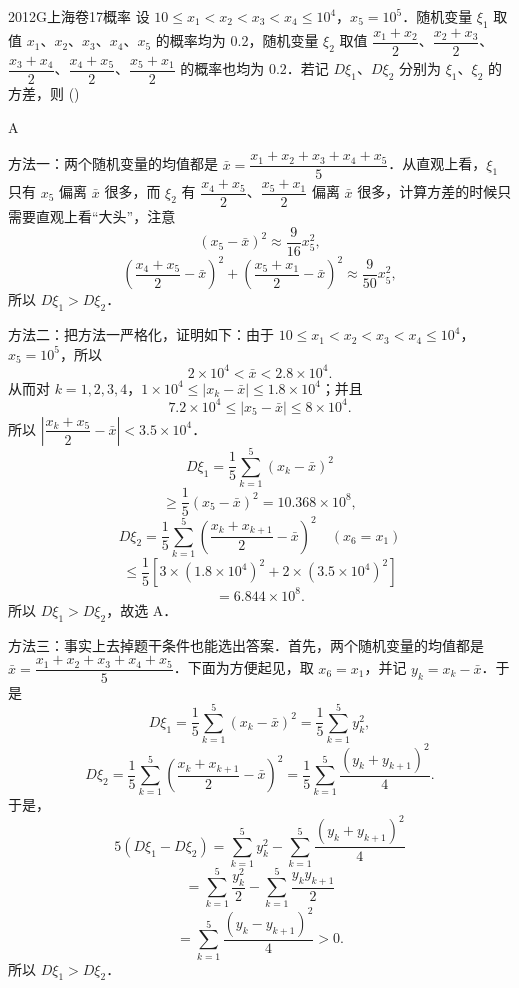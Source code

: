 
\begin{problem}{2012}{G}{上海卷}{17}{概率}
设 $10\leqslant x_1<x_2<x_3<x_4\leqslant 10^4$，$x_5=10^5$．随机变量 $\xi_1$ 取值 $x_1$、$x_2$、$x_3$、$x_4$、$x_5$ 的概率均为 $0.2$，随机变量 $\xi_2$ 取值 $\dfrac{x_1+x_2}{2}$、$\dfrac{x_2+x_3}{2}$、$\dfrac{x_3+x_4}{2}$、$\dfrac{x_4+x_5}{2}$、$\dfrac{x_5+x_1}{2}$ 的概率也均为 $0.2$．若记 $D\xi_1$、$D\xi_2$ 分别为 $\xi_1$、$\xi_2$ 的方差，则 (\hspace{1cm})
\begin{choices}
\end{choices}
\end{problem}

\begin{answer}
A
\end{answer}

\begin{solutions}
方法一：两个随机变量的均值都是 $\bar{x}=\dfrac{x_1+x_2+x_3+x_4+x_5}{5}$．从直观上看，$\xi_1$ 只有 $x_5$ 偏离 $\bar{x}$ 很多，而 $\xi_2$ 有 $\dfrac{x_4+x_5}{2}$、$\dfrac{x_5+x_1}{2}$ 偏离 $\bar{x}$ 很多，计算方差的时候只需要直观上看“大头”，注意
$$
(x_5-\bar{x})^2\approx\dfrac{9}{16}x_5^2,
$$
$$
\left(\dfrac{x_4+x_5}{2}-\bar{x}\right)^2+\left(\dfrac{x_5+x_1}{2}-\bar{x}\right)^2\approx\dfrac{9}{50}x_5^2,
$$
所以 $D\xi_1>D\xi_2$．

方法二：把方法一严格化，证明如下：由于 $10\leqslant x_1<x_2<x_3<x_4\leqslant 10^4$，$x_5=10^5$，所以
$$
2\times 10^4<\bar{x}<2.8\times 10^4.
$$
从而对 $k=1,2,3,4$，$1\times 10^4\leqslant |x_k-\bar{x}|\leqslant 1.8\times 10^4$；并且
$$
7.2\times 10^4\leqslant |x_5-\bar{x}|\leqslant 8\times 10^4.
$$
所以 $\left|\dfrac{x_k+x_5}{2}-\bar{x}\right|<3.5\times 10^4$．
$$
D\xi_1=\dfrac{1}{5}\sum_{k=1}^{5}(x_k-\bar{x})^2
$$
$$
\geqslant\dfrac{1}{5}(x_5-\bar{x})^2=10.368\times 10^8,
$$
$$
D\xi_2=\dfrac{1}{5}\sum_{k=1}^{5}\left(\dfrac{x_k+x_{k+1}}{2}-\bar{x}\right)^2\quad (x_6=x_1)
$$
$$
\leqslant\dfrac{1}{5}\left[3\times(1.8\times 10^4)^2+2\times(3.5\times 10^4)^2\right]
$$
$$
=6.844\times 10^8.
$$
所以 $D\xi_1>D\xi_2$，故选 A．

方法三：事实上去掉题干条件也能选出答案．首先，两个随机变量的均值都是 $\bar{x}=\dfrac{x_1+x_2+x_3+x_4+x_5}{5}$．下面为方便起见，取 $x_6=x_1$，并记 $y_k=x_k-\bar{x}$．于是
$$
D\xi_1=\dfrac{1}{5}\sum_{k=1}^{5}(x_k-\bar{x})^2=\dfrac{1}{5}\sum_{k=1}^{5}y_k^2,
$$
$$
D\xi_2=\dfrac{1}{5}\sum_{k=1}^{5}\left(\dfrac{x_k+x_{k+1}}{2}-\bar{x}\right)^2=\dfrac{1}{5}\sum_{k=1}^{5}\dfrac{(y_k+y_{k+1})^2}{4}.
$$
于是，
$$
5(D\xi_1-D\xi_2)=\sum_{k=1}^{5}y_k^2-\sum_{k=1}^{5}\dfrac{(y_k+y_{k+1})^2}{4}
$$
$$
=\sum_{k=1}^{5}\dfrac{y_k^2}{2}-\sum_{k=1}^{5}\dfrac{y_k y_{k+1}}{2}
$$
$$
=\sum_{k=1}^{5}\dfrac{(y_k-y_{k+1})^2}{4}>0.
$$
所以 $D\xi_1>D\xi_2$．
\end{solutions}